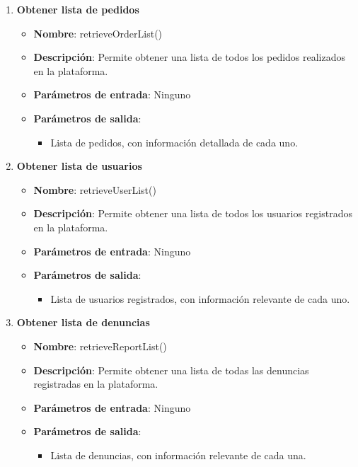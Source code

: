 \begin{enumerate}[label=SOP-\protect\twodigits{\arabic*}:, align=left, leftmargin=*]
        
\item \textbf{Obtener lista de pedidos}
\begin{itemize}
\item \textbf{Nombre}: retrieveOrderList()
\item \textbf{Descripción}: Permite obtener una lista de todos los pedidos realizados en la plataforma.
\item \textbf{Parámetros de entrada}: Ninguno
\item \textbf{Parámetros de salida}:
\begin{itemize}
\item Lista de pedidos, con información detallada de cada uno.
\end{itemize}
\end{itemize}

\item \textbf{Obtener lista de usuarios}
\begin{itemize}
\item \textbf{Nombre}: retrieveUserList()
\item \textbf{Descripción}: Permite obtener una lista de todos los usuarios registrados en la plataforma.
\item \textbf{Parámetros de entrada}: Ninguno
\item \textbf{Parámetros de salida}:
\begin{itemize}
\item Lista de usuarios registrados, con información relevante de cada uno.
\end{itemize}
\end{itemize}

\item \textbf{Obtener lista de denuncias}
\begin{itemize}
\item \textbf{Nombre}: retrieveReportList()
\item \textbf{Descripción}: Permite obtener una lista de todas las denuncias registradas en la plataforma.
\item \textbf{Parámetros de entrada}: Ninguno
\item \textbf{Parámetros de salida}:
\begin{itemize}
\item Lista de denuncias, con información relevante de cada una.
\end{itemize}
\end{itemize}


\end{enumerate}
